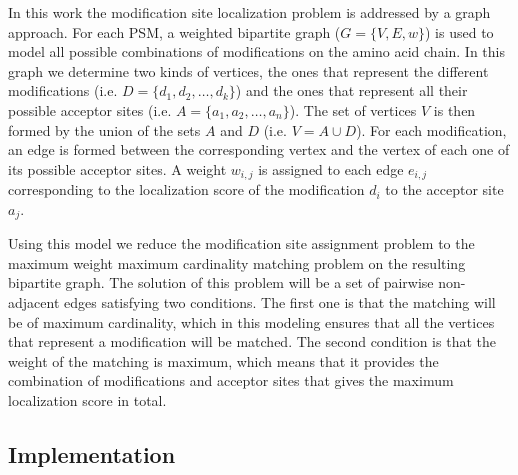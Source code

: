 \documentclass[]{article}
\begin{document}
In this work the modification site localization problem is addressed by a graph approach. For each PSM, a weighted  bipartite graph ($G = \{V,E,w\}$) is used to model all possible combinations of modifications on the amino acid chain. In this graph we determine two kinds of vertices, the ones that represent the different modifications (i.e. $D = \{d_1, d_2, \dots, d_k\}$) and the ones that represent all their possible acceptor sites (i.e. $A = \{a_1, a_2, \dots, a_n\}$).  The set of vertices $V$ is then formed by the union of the sets $A$ and $D$ (i.e. $V = A \cup D$). For each modification, an edge is formed between the corresponding vertex and the vertex of each one of its possible acceptor sites. A weight $w_{i,j}$ is assigned to each edge $e_{i,j}$ corresponding to the localization score of the modification $d_i$ to the acceptor site $a_j$.

Using this model we reduce the modification site assignment problem to the maximum weight maximum cardinality matching problem on the resulting bipartite graph. The solution of this problem will be a set of pairwise non-adjacent edges satisfying two conditions. The first one is that the matching will be of maximum cardinality, which in this modeling ensures that all the vertices that represent a modification will be matched. The second condition is that the weight of the matching is maximum, which means that it provides the combination of modifications and acceptor sites that gives the maximum localization score in total.


\subsection{Implementation}
\end{document}
